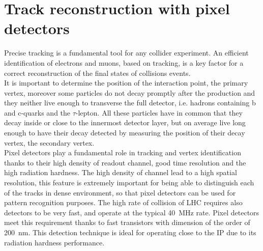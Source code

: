 \section{Track reconstruction with pixel detectors}\label{sec:Tracking with pixel}
Precise tracking is a fundamental tool for any collider experiment. An efficient identification of electrons and muons, based on tracking, is a key factor for a correct reconstruction of the final states of collisions events.\\
It is important to determine the position of the interaction point, the primary vertex, moreover some particles do not decay promptly after the production and they neither live enough to transverse the full detector, i.e. hadrons containing b and c-quarks and the $\tau$-lepton.
All these particles have in common that they decay inside or close to the innermost detector layer, but on average live long enough to have their decay detected by measuring the position of their decay vertex, the secondary vertex.\\
Pixel detectors play a fundamental role in tracking and vertex identification thanks to their high density of readout channel, good time resolution and the high radiation hardness.
The high density of channel lead to a high spatial resolution, this feature is extremely important for being able to distinguish each of the tracks in dense environment, so that pixel detectors can be used for pattern recognition purposes.
The high rate of collision of LHC requires also detectors to be very fast, and operate at the typical \SI{40}{\mega\hertz} rate. Pixel detectors meet this requirement thanks to fast transistors with dimension of the order of \SI{200}{\nano\meter}. This detection technique is ideal for operating close to the IP due to its radiation hardness performance.
